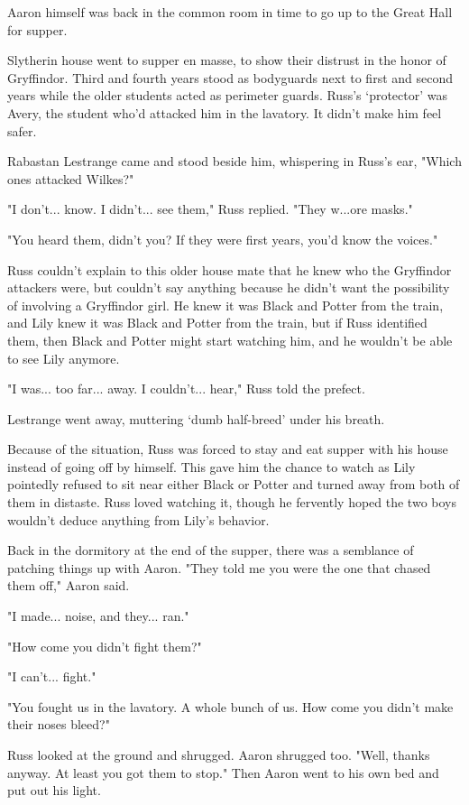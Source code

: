 \documentclass[a4paper,11pt]{article}
\begin{document}
Aaron himself was back in the common room in time to go up to the Great Hall for supper.

Slytherin house went to supper en masse, to show their distrust in the honor of Gryffindor. Third and fourth years stood as bodyguards next to first and second years while the older students acted as perimeter guards. Russ's `protector' was Avery, the student who'd attacked him in the lavatory. It didn't make him feel safer.

Rabastan Lestrange came and stood beside him, whispering in Russ's ear, "Which ones attacked Wilkes?"

"I don't... know. I didn't... see them," Russ replied. "They w...ore masks."

"You heard them, didn't you? If they were first years, you'd know the voices."

Russ couldn't explain to this older house mate that he knew who the Gryffindor attackers were, but couldn't say anything because he didn't want the possibility of involving a Gryffindor girl. He knew it was Black and Potter from the train, and Lily knew it was Black and Potter from the train, but if Russ identified them, then Black and Potter might start watching him, and he wouldn't be able to see Lily anymore.

"I was... too far... away. I couldn't... hear," Russ told the prefect.

Lestrange went away, muttering `dumb half-breed' under his breath.

Because of the situation, Russ was forced to stay and eat supper with his house instead of going off by himself. This gave him the chance to watch as Lily pointedly refused to sit near either Black or Potter and turned away from both of them in distaste. Russ loved watching it, though he fervently hoped the two boys wouldn't deduce anything from Lily's behavior.

Back in the dormitory at the end of the supper, there was a semblance of patching things up with Aaron. "They told me you were the one that chased them off," Aaron said.

"I made... noise, and they... ran."

"How come you didn't fight them?"

"I can't... fight."

"You fought us in the lavatory. A whole bunch of us. How come you didn't make their noses bleed?"

Russ looked at the ground and shrugged. Aaron shrugged too. "Well, thanks anyway. At least you got them to stop." Then Aaron went to his own bed and put out his light.
\end{document}
